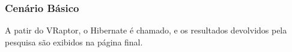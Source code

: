 \documentclass[11pt, a4paper]{article}
\begin{document}
	        \subsubsection{Cenário Básico}
                A patir do VRaptor, o Hibernate é chamado, e os resultados devolvidos pela pesquisa são exibidos na página final.
\end{document}
